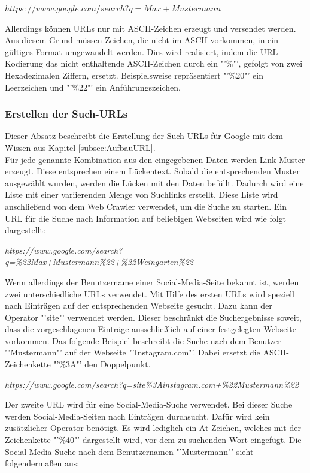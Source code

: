 			$https://www.google.com/search?q=Max+Mustermann$
			
			Allerdings können URLs nur mit ASCII-Zeichen erzeugt und versendet werden. Aus diesem Grund müssen Zeichen, die nicht im ASCII vorkommen, in ein gültiges Format umgewandelt werden. Dies wird realisiert, indem die URL-Kodierung das nicht enthaltende ASCII-Zeichen durch ein "'\%"', gefolgt von zwei Hexadezimalen Ziffern, ersetzt. Beispielsweise repräsentiert "'\%20"' ein Leerzeichen und "'\%22"' ein Anführungszeichen. \cite{HTMLURL} \\
			
			\subsubsection{Erstellen der Such-URLs}
			Dieser Absatz beschreibt die Erstellung der Such-URLs für Google mit dem Wissen aus Kapitel \ref{subsec:AufbauURL}.\\
			Für jede genannte Kombination aus den eingegebenen Daten werden Link-Muster erzeugt. Diese entsprechen einem Lückentext. Sobald die entsprechenden Muster ausgewählt wurden, werden die Lücken mit den Daten befüllt. Dadurch wird eine Liste mit einer variierenden Menge von Suchlinks erstellt. Diese Liste wird anschließend von dem Web Crawler verwendet, um die Suche zu starten.
			Ein URL für die Suche nach Information auf beliebigen Webseiten wird wie folgt dargestellt:
					
			\textit{https://www.google.com/search?q=\%22Max+Mustermann\%22+\%22Weingarten\%22}
			
			Wenn allerdings der Benutzername einer Social-Media-Seite bekannt ist, werden zwei unterschiedliche URLs verwendet. Mit Hilfe des ersten URLs wird speziell nach Einträgen auf der entsprechenden Webseite gesucht. Dazu kann der Operator "'site"' verwendet werden. Dieser beschränkt die Suchergebnisse soweit, dass die vorgeschlagenen Einträge ausschließlich auf einer festgelegten Webseite vorkommen. Das folgende Beispiel beschreibt die Suche nach dem Benutzer "'Mustermann"' auf der Webseite "'Instagram.com"'. Dabei ersetzt die ASCII-Zeichenkette "'\%3A"' den Doppelpunkt. \cite{HTMLURL}
			
			\textit{https://www.google.com/search?q=site\%3Ainstagram.com+\%22Mustermann\%22}
			
			Der zweite URL wird für eine Social-Media-Suche verwendet. Bei dieser Suche werden Social-Media-Seiten nach Einträgen durchsucht. Dafür wird kein zusätzlicher Operator benötigt. Es wird lediglich ein At-Zeichen, welches mit der Zeichenkette "'\%40"' dargestellt wird, vor dem zu suchenden Wort eingefügt. Die Social-Media-Suche nach dem Benutzernamen "'Mustermann"' sieht folgendermaßen aus:\cite{SocialMediaSearch}
			
